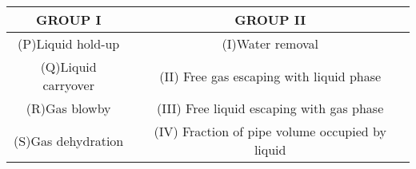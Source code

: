 \begin{tabular}[12pt]{|c|c|}
\hline
\textbf{GROUP I}&\textbf{GROUP II}\\
\hline
(P)Liquid hold-up&(I)Water removal\\
\hline
(Q)Liquid carryover&(II) Free gas escaping with liquid phase\\
\hline
(R)Gas blowby&(III) Free liquid escaping with gas phase\\
\hline
(S)Gas dehydration&(IV) Fraction of pipe volume occupied by liquid\\
\hline
\end{tabular}